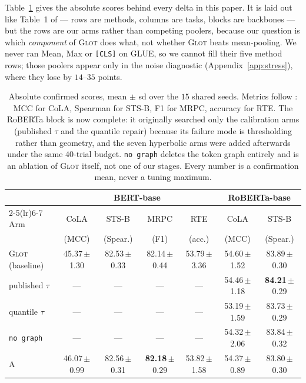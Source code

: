\documentclass{article}
\begin{document}
Table~\ref{tab:absolute} gives the absolute scores behind every delta in this
paper. It is laid out like Table~1 of \citet{mantri2026glot} --- rows are
methods, columns are tasks, blocks are backbones --- but the rows are our arms
rather than competing poolers, because our question is which \emph{component}
of \textsc{Glot} does what, not whether \textsc{Glot} beats mean-pooling. We
never ran Mean, Max or \texttt{[CLS]} on GLUE, so we cannot fill their five
method rows; those poolers appear only in the noise diagnostic
(Appendix~\ref{app:stress}), where they lose by $14$--$35$ points.

\begin{table}[h]
\caption{Absolute confirmed scores, mean $\pm$ sd over the $15$ shared seeds.
Metrics follow \citet{mantri2026glot}: MCC for CoLA, Spearman for STS-B, F1 for
MRPC, accuracy for RTE. The RoBERTa block is now complete: it originally
searched only the calibration arms (published $\tau$ and the quantile repair)
because its failure mode is thresholding rather than geometry, and the seven
hyperbolic arms were added afterwards under the same $40$-trial budget.
\texttt{no graph} deletes the token graph entirely and is an ablation of
\textsc{Glot} itself, not one of our stages. Every number is a confirmation
mean, never a tuning maximum.}
\label{tab:absolute}
\begin{center}
\footnotesize
\setlength{\tabcolsep}{4pt}
\begin{tabular}{lcccccc}
\toprule
 & \multicolumn{4}{c}{BERT-base} & \multicolumn{2}{c}{RoBERTa-base} \\
\cmidrule(lr){2-5}\cmidrule(lr){6-7}
Arm & CoLA & STS-B & MRPC & RTE & CoLA & STS-B \\
    & (MCC) & (Spear.) & (F1) & (acc.) & (MCC) & (Spear.) \\
\midrule
\textsc{Glot} (baseline) & 45.37\,$\pm$1.30 & 82.53\,$\pm$0.33 & 82.14\,$\pm$0.44 & 53.79\,$\pm$3.36 & 54.60\,$\pm$1.52 & 83.89\,$\pm$0.30 \\
published $\tau$         & --- & --- & --- & --- & 54.46\,$\pm$1.18 & \textbf{84.21}\,$\pm$0.29 \\
quantile $\tau$          & --- & --- & --- & --- & 53.19\,$\pm$1.59 & 83.73\,$\pm$0.29 \\
\texttt{no graph}        & --- & --- & --- & --- & 54.32\,$\pm$2.06 & 83.84\,$\pm$0.32 \\
\midrule
A   & 46.07\,$\pm$0.99 & 82.56\,$\pm$0.31 & \textbf{82.18}\,$\pm$0.29 & 53.82\,$\pm$1.58 & 54.37\,$\pm$0.89 & 83.80\,$\pm$0.30 \\

\end{tabular}
\end{center}
\end{table}
\end{document}
